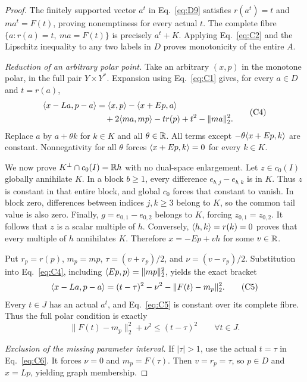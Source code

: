 \begin{proof}
The finitely supported vector $a^t$ in Eq.~\eqref{eq:D9} satisfies $r(a^t)=t$ and
$ma^t=F(t)$, proving nonemptiness for every actual $t$. The complete
fibre $\{a:r(a)=t,\ ma=F(t)\}$ is precisely $a^t+K$.
Applying Eq.~\eqref{eq:C2} and the Lipschitz inequality to any two labels
in $D$ proves monotonicity of the entire $A$.

\noindent\textit{Reduction of an arbitrary polar point.}
\label{sec:C3}
Take an arbitrary $(x,p)$ in the monotone polar, in the full pair
$Y\times Y^*$. Expansion using Eq.~\eqref{eq:C1} gives, for every
$a\in D$ and $t=r(a)$,
\begin{equation}
\begin{aligned}
\langle x-La,p-a\rangle
 &=\langle x,p\rangle-\langle x+Ep,a\rangle\\
 &\quad+2\langle ma,mp\rangle-t r(p)+t^2-\|ma\|_2^2.
\end{aligned}
\tag{C4}\label{eq:C4}
\end{equation}
Replace $a$ by $a+\theta k$ for $k\in K$ and all $\theta\in\mathbb R$.
All terms except $-\theta\langle x+Ep,k\rangle$ are constant.
Nonnegativity for all $\theta$ forces $\langle x+Ep,k\rangle=0$ for every $k\in K$.

We now prove $K^\perp\cap c_0(I)=\mathbb R h$ with no dual-space enlargement.
Let $z\in c_0(I)$ globally annihilate $K$. In a block $b\ge1$, every
difference $e_{b,j}-e_{b,k}$ is in $K$. Thus $z$ is constant in that
entire block, and global $c_0$ forces that constant to vanish. In block
zero, differences between indices $j,k\ge3$ belong to $K$, so the common
tail value is also zero. Finally, $g=e_{0,1}-e_{0,2}$ belongs to $K$,
forcing $z_{0,1}=z_{0,2}$. It follows that $z$ is a scalar multiple of
$h$. Conversely, $\langle h,k\rangle=r(k)=0$ proves that every multiple of $h$
annihilates $K$. Therefore $x=-Ep+vh$ for some $v\in\mathbb R$.

Put $r_p=r(p)$, $m_p=mp$, $\tau=(v+r_p)/2$, and $\nu=(v-r_p)/2$.
Substitution into Eq.~\eqref{eq:C4}, including
$\langle Ep,p\rangle=\|mp\|_2^2$, yields the exact bracket
\begin{equation}
\langle x-La,p-a\rangle
 =(t-\tau)^2-\nu^2-\|F(t)-m_p\|_2^2.
\tag{C5}\label{eq:C5}
\end{equation}
Every $t\in J$ has an actual $a^t$, and Eq.~\eqref{eq:C5} is constant
over its complete fibre. Thus the full polar condition is exactly
\begin{equation}
\|F(t)-m_p\|_2^2+\nu^2\le(t-\tau)^2
\qquad\forall t\in J.
\tag{C6}\label{eq:C6}
\end{equation}

\noindent\textit{Exclusion of the missing parameter interval.}
\label{sec:C4}
If $|\tau|>1$, use the actual $t=\tau$ in Eq.~\eqref{eq:C6}. It forces
$\nu=0$ and $m_p=F(\tau)$. Then $v=r_p=\tau$, so $p\in D$ and $x=Lp$,
yielding graph membership.


\end{proof}
